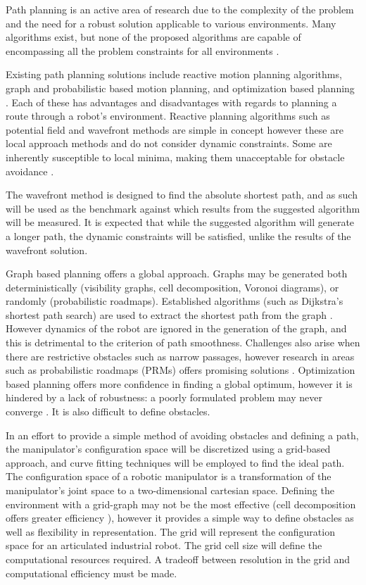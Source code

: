 %
Path planning is an active area of research due to the complexity of the problem and the need for a robust solution applicable to various environments. Many algorithms exist, but none of the proposed algorithms are capable of encompassing all the problem constraints for all environments \cite{sariff06}.

Existing path planning solutions include reactive motion planning algorithms, graph and probabilistic based motion planning, and optimization based planning \cite{waslanderI}. Each of these has advantages and disadvantages with regards to planning a route through a robot's environment. Reactive planning algorithms such as potential field and wavefront methods are simple in concept however these are local approach methods and do not consider dynamic constraints. Some are inherently susceptible to local minima, making them unacceptable for obstacle avoidance \cite{koren91}. 

The wavefront method is designed to find the absolute shortest path, and as such will be used as the benchmark against which results from the suggested algorithm will be measured. It is expected that while the suggested algorithm will generate a longer path, the dynamic constraints will be satisfied, unlike the results of the wavefront solution.

Graph based planning offers a global approach. Graphs may be generated both deterministically (visibility graphs, cell decomposition, Voronoi diagrams), or randomly (probabilistic roadmaps). Established algorithms (such as Dijkstra's shortest path search) are used to extract the shortest path from the graph \cite{dijkstra59}. However dynamics of the robot are ignored in the generation of the graph, and this is detrimental to the criterion of path smoothness. Challenges also arise when there are restrictive obstacles such as narrow passages, however research in areas such as probabilistic roadmaps (PRMs) offers promising solutions \cite{hsu03}. Optimization based planning offers more confidence in finding a global optimum, however it is hindered by a lack of robustness: a poorly formulated problem may never converge \cite{waslanderIII}. It is also difficult to define obstacles.

In an effort to provide a simple method of avoiding obstacles and defining a path, the manipulator's configuration space will be discretized using a grid-based approach, and curve fitting techniques will be employed to find the ideal path. The configuration space of a robotic manipulator is a transformation of the manipulator's joint space to a two-dimensional cartesian space. Defining the environment with a grid-graph may not be the most effective (cell decomposition offers greater efficiency \cite{lingelbach04}), however it provides a simple way to define obstacles as well as flexibility in representation. The grid will represent the configuration space for an articulated industrial robot. The grid cell size will define the computational resources required. A tradeoff between resolution in the grid and computational efficiency must be made.

